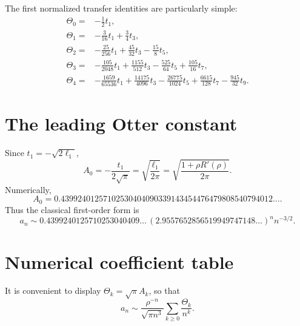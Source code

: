 \documentclass[11pt,a4paper,oneside,openany]{book}
\theoremstyle{definition}
\theoremstyle{remark}
\begin{document}
The first normalized transfer identities are particularly simple:
\begin{align}
 \Theta_0={}&-\frac12t_1,\label{eq:Theta0-t}\\
 \Theta_1={}&-\frac3{16}t_1+\frac34t_3,\label{eq:Theta1-t}\\
 \Theta_2={}&-\frac{25}{256}t_1+\frac{45}{32}t_3-\frac{15}{8}t_5,
 \label{eq:Theta2-t}\\
 \Theta_3={}&-\frac{105}{2048}t_1+\frac{1155}{512}t_3
              -\frac{525}{64}t_5+\frac{105}{16}t_7,
 \label{eq:Theta3-t}\\
 \Theta_4={}&-\frac{1659}{65536}t_1+\frac{14175}{4096}t_3
              -\frac{26775}{1024}t_5+\frac{6615}{128}t_7
              -\frac{945}{32}t_9.
 \label{eq:Theta4-t}
\end{align}

\section{The leading Otter constant}
Since $t_1=-\sqrt{2\ell_1}$,
\begin{equation}
 A_0=-\frac{t_1}{2\sqrt\pi}
 =\sqrt{\frac{\ell_1}{2\pi}}
 =\sqrt{\frac{1+\rho R'(\rho)}{2\pi}}.
 \label{eq:Otter-constant-formula}
\end{equation}
Numerically,
\begin{equation}
 A_0=0.43992401257102530404090339143454476479808540794012\ldots .
 \label{eq:A0-numeric}
\end{equation}
Thus the classical first-order form is
\begin{equation}
 a_n\sim
 0.4399240125710253040409\ldots\,
 (2.9557652856519949747148\ldots)^n n^{-3/2}.
 \label{eq:Otter-leading}
\end{equation}

\section{Numerical coefficient table}
It is convenient to display $\Theta_k=\sqrt\pi A_k$, so that
\begin{equation}
 a_n\sim\frac{\rho^{-n}}{\sqrt{\pi n^3}}
 \sum_{k\ge0}\frac{\Theta_k}{n^k}.
 \label{eq:forward-Theta}
\end{equation}
\end{document}
